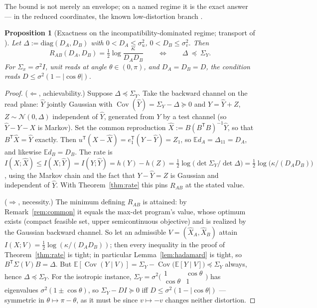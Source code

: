 \documentclass[11pt]{article}
\newtheorem{proposition}{Proposition}\newtheorem{corollary}{Corollary}
\newcommand{\E}{\mathbb{E}}\newcommand{\tr}{\operatorname{tr}}
\newcommand{\Cov}{\operatorname{Cov}}\newcommand{\Var}{\operatorname{Var}}
\newcommand{\hX}{\widehat X}\newcommand{\hY}{\widehat Y}
\begin{document}
The bound is not merely an envelope; on a named regime it is the exact
answer --- in the reduced coordinates, the known low-distortion branch
\cite{xiaoluo2005,lapidothtinguely2010,stylianou2021}.

\begin{proposition}[Exactness on the incompatibility-dominated regime;
transport of \cite{xiaoluo2005,lapidothtinguely2010,stylianou2021}]
\label{prop:exact}
Let $\Delta:=\mathrm{diag}(D_A,D_B)$ with $0<D_A\le\sigma_u^2$,
$0<D_B\le\sigma_v^2$. Then
\[
R_{AB}(D_A,D_B)=\tfrac12\log\frac{\kappa}{D_AD_B}
\qquad\Longleftrightarrow\qquad
\Delta\ \preceq\ \Sigma_Y .
\]
For $\Sigma_x=\sigma^2I$, unit reads at angle $\theta\in(0,\pi)$, and
$D_A=D_B=D$, the condition reads $D\le\sigma^2(1-\lvert\cos\theta\rvert)$.
\end{proposition}
\begin{proof}
($\Leftarrow$, achievability.) Suppose $\Delta\preceq\Sigma_Y$. Take the
backward channel on the read plane: $\hY$ jointly Gaussian with
$\Cov(\hY)=\Sigma_Y-\Delta\succeq0$ and $Y=\hY+Z$,
$Z\sim\mathcal N(0,\Delta)$ independent of $\hY$, generated from $Y$ by a
test channel (so $\hY-Y-X$ is Markov). Set the common reproduction
$\hX:=B(B^{\mathsf T}B)^{-1}\hY$, so that $B^{\mathsf T}\hX=\hY$ exactly.
Then $u^{\mathsf T}(X-\hX)=e_1^{\mathsf T}(Y-\hY)=Z_1$, so
$\E d_A=\Delta_{11}=D_A$, and likewise $\E d_B=D_B$. The rate is
$I(X;\hX)\le I(X;\hY)=I(Y;\hY)=h(Y)-h(Z)
=\tfrac12\log\bigl(\det\Sigma_Y/\det\Delta\bigr)
=\tfrac12\log\bigl(\kappa/(D_AD_B)\bigr)$, using the Markov chain and the
fact that $Y-\hY=Z$ is Gaussian and independent of $\hY$. With
Theorem~\ref{thm:rate} this pins $R_{AB}$ at the stated value.

($\Rightarrow$, necessity.) The minimum defining $R_{AB}$ is attained: by
Remark~\ref{rem:common} it equals the max-det program's value, whose optimum
exists (compact feasible set, upper semicontinuous objective) and is realized
by the Gaussian backward channel. So let an admissible $V=(\hX_A,\hX_B)$
attain
$I(X;V)=\tfrac12\log(\kappa/(D_AD_B))$; then every inequality in the proof of
Theorem~\ref{thm:rate} is tight; in particular Lemma~\ref{lem:hadamard} is
tight, so $B^{\mathsf T}\Sigma(V)B=\Delta$. But
$\E[\Cov(Y\mid V)]=\Sigma_Y-\Cov\bigl(\E[Y\mid V]\bigr)\preceq\Sigma_Y$
always, hence $\Delta\preceq\Sigma_Y$. For the isotropic instance,
$\Sigma_Y=\sigma^2\bigl(\begin{smallmatrix}1&\cos\theta\\
\cos\theta&1\end{smallmatrix}\bigr)$ has eigenvalues
$\sigma^2(1\pm\cos\theta)$, so
$\Sigma_Y-DI\succeq0$ iff $D\le\sigma^2(1-\lvert\cos\theta\rvert)$
--- symmetric in $\theta\mapsto\pi-\theta$, as it must be since $v\mapsto-v$
changes neither distortion.
\end{proof}
\end{document}
